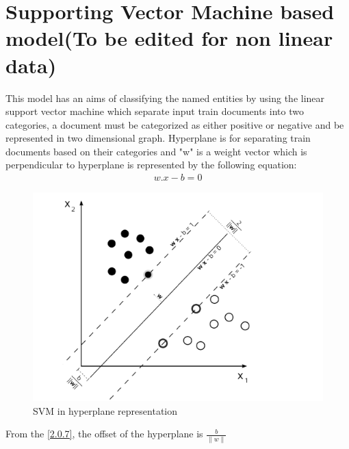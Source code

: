 \section{Supporting Vector Machine based model(To be edited for non linear data)}
This model has an aims of classifying the named entities by using the linear support vector machine which separate input train documents into two categories, a document must be categorized as either positive or negative and be represented in two dimensional graph.
Hyperplane is for separating train documents based on their categories and "w" is a weight vector  which is perpendicular to hyperplane is represented by the following equation: 
\begin{align}
w.x- b = 0 \label{2.0.7}
\end{align}
\begin{figure}[hbtp]
\caption{SVM in hyperplane representation}
\centering
\includegraphics[scale=.7]{images/svm.png}
\end{figure}

 

From the \eqref{2.0.7}, the offset of the hyperplane is $ \frac{b}{\parallel  w \parallel} $

